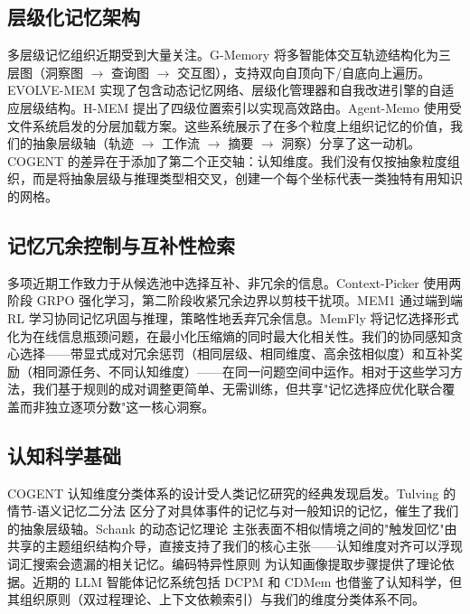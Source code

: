\documentclass[UTF8,twocolumn]{ctexart}
\begin{document}
\subsection{层级化记忆架构}

多层级记忆组织近期受到大量关注。G-Memory \cite{g-memory} 将多智能体交互轨迹结构化为三层图（洞察图 $\rightarrow$ 查询图 $\rightarrow$ 交互图），支持双向自顶向下/自底向上遍历。EVOLVE-MEM \cite{evolve-mem} 实现了包含动态记忆网络、层级化管理器和自我改进引擎的自适应层级结构。H-MEM \cite{h-mem} 提出了四级位置索引以实现高效路由。Agent-Memo 使用受文件系统启发的分层加载方案。这些系统展示了在多个粒度上组织记忆的价值，我们的抽象层级轴（轨迹 $\rightarrow$ 工作流 $\rightarrow$ 摘要 $\rightarrow$ 洞察）分享了这一动机。\textsc{COGENT} 的差异在于添加了第二个正交轴：认知维度。我们没有仅按抽象粒度组织，而是将抽象层级与推理类型相交叉，创建一个每个坐标代表一类独特有用知识的网格。

\subsection{记忆冗余控制与互补性检索}

多项近期工作致力于从候选池中选择互补、非冗余的信息。Context-Picker \cite{context-picker} 使用两阶段 GRPO 强化学习，第二阶段收紧冗余边界以剪枝干扰项。MEM1 \cite{mem1} 通过端到端 RL 学习协同记忆巩固与推理，策略性地丢弃冗余信息。MemFly \cite{memfly} 将记忆选择形式化为在线信息瓶颈问题，在最小化压缩熵的同时最大化相关性。我们的协同感知贪心选择——带显式成对冗余惩罚（相同层级、相同维度、高余弦相似度）和互补奖励（相同源任务、不同认知维度）——在同一问题空间中运作。相对于这些学习方法，我们基于规则的成对调整更简单、无需训练，但共享"记忆选择应优化联合覆盖而非独立逐项分数"这一核心洞察。

\subsection{认知科学基础}

\textsc{COGENT} 认知维度分类体系的设计受人类记忆研究的经典发现启发。Tulving 的情节-语义记忆二分法 \cite{tulving-episodic} 区分了对具体事件的记忆与对一般知识的记忆，催生了我们的抽象层级轴。Schank 的动态记忆理论 \cite{schank-dynamic} 主张表面不相似情境之间的"触发回忆"由共享的主题组织结构介导，直接支持了我们的核心主张——认知维度对齐可以浮现词汇搜索会遗漏的相关记忆。编码特异性原则 \cite{tulving-encoding} 为认知画像提取步骤提供了理论依据。近期的 LLM 智能体记忆系统包括 DCPM \cite{dcpm} 和 CDMem \cite{cdmem} 也借鉴了认知科学，但其组织原则（双过程理论、上下文依赖索引）与我们的维度分类体系不同。
\end{document}
